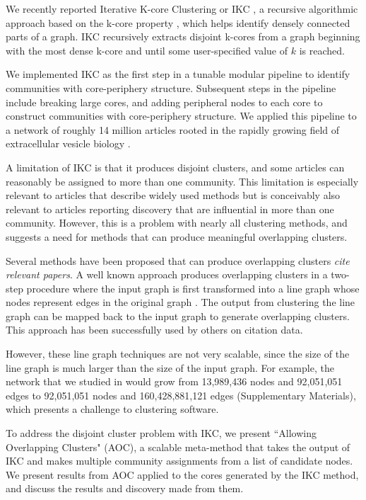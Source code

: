 \documentclass[12pt, oneside]{article}   	%
\begin{document}
We recently reported Iterative K-core Clustering or IKC \citep{Wedell2022}, a recursive algorithmic approach based on the k-core property \citep{Giatsidis2011,malliaros2019}, which helps identify densely connected parts of a graph. IKC recursively extracts disjoint k-cores from a graph beginning with the most dense  k-core and until some user-specified value of $k$ is reached. 

We implemented IKC as the first step in a tunable modular pipeline to identify communities with core-periphery structure. Subsequent steps in the pipeline include breaking large cores, and adding peripheral nodes to each core to construct communities with core-periphery structure. We applied this pipeline to a network of roughly 14 million articles rooted in the rapidly growing field of extracellular vesicle biology \citep{Wedell2022}. 

A limitation of IKC is that  it produces disjoint clusters, and some articles can reasonably be assigned to more than one community. This limitation is especially relevant to articles that describe widely used methods but is conceivably also relevant to articles reporting discovery that are influential in more than one community.   However, this is a problem with nearly all clustering methods, and suggests a need for methods that can produce meaningful overlapping clusters. 

Several methods have been proposed that can produce overlapping clusters \emph{cite relevant papers}. A well known approach produces overlapping clusters  in a two-step procedure where the input graph is first transformed into a line graph whose nodes represent edges in the original graph \citep{Harary1960}.  The output from clustering the line graph can be mapped back to the input graph to generate overlapping clusters. This approach has been successfully used by others \citep{Evans2009,Havemann2021} on citation data. 

However, these line graph  techniques are not very scalable, since the size of the line graph is much larger than the size of the input graph. For example, the network that we studied in \cite{Wedell2022} would grow from 13,989,436 nodes and 92,051,051 edges to 92,051,051 nodes and 160,428,881,121 edges (Supplementary Materials), which presents a challenge to clustering software.
 
To address the disjoint cluster problem with IKC, we present ``Allowing Overlapping Clusters" (AOC), a scalable meta-method that takes the output of IKC and makes multiple community assignments from a list of candidate nodes. We present results from AOC applied to the cores generated by the IKC method, and discuss the results and discovery made from them.
 
\end{document}
